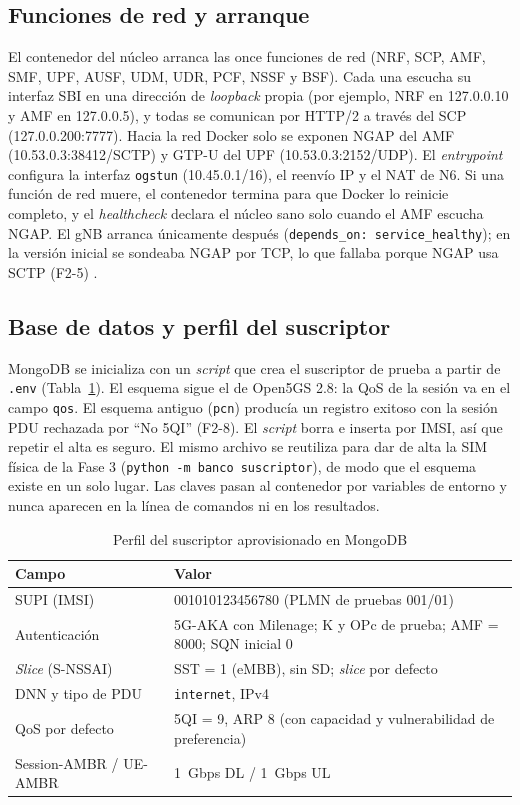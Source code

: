 \documentclass[conference]{IEEEtran}
\begin{document}
\subsection{Funciones de red y arranque}
El contenedor del núcleo arranca las once funciones de red (NRF, SCP, AMF, SMF, UPF, AUSF, UDM, UDR, PCF, NSSF y BSF). Cada una escucha su interfaz SBI en una dirección de \textit{loopback} propia (por ejemplo, NRF en 127.0.0.10 y AMF en 127.0.0.5), y todas se comunican por HTTP/2 a través del SCP (127.0.0.200:7777). Hacia la red Docker solo se exponen NGAP del AMF (10.53.0.3:38412/SCTP) y GTP-U del UPF (10.53.0.3:2152/UDP). El \textit{entrypoint} configura la interfaz \texttt{ogstun} (10.45.0.1/16), el reenvío IP y el NAT de N6. Si una función de red muere, el contenedor termina para que Docker lo reinicie completo, y el \textit{healthcheck} declara el núcleo sano solo cuando el AMF escucha NGAP. El gNB arranca únicamente después (\texttt{depends\_on: service\_healthy}); en la versión inicial se sondeaba NGAP por TCP, lo que fallaba porque NGAP usa SCTP (F2-5) \cite{rfc4960}.

\subsection{Base de datos y perfil del suscriptor}
MongoDB se inicializa con un \textit{script} que crea el suscriptor de prueba a partir de \texttt{.env} (Tabla~\ref{tab:suscriptor}). El esquema sigue el de Open5GS 2.8: la QoS de la sesión va en el campo \texttt{qos}. El esquema antiguo (\texttt{pcn}) producía un registro exitoso con la sesión PDU rechazada por ``No 5QI'' (F2-8). El \textit{script} borra e inserta por IMSI, así que repetir el alta es seguro. El mismo archivo se reutiliza para dar de alta la SIM física de la Fase 3 (\texttt{python -m banco suscriptor}), de modo que el esquema existe en un solo lugar. Las claves pasan al contenedor por variables de entorno y nunca aparecen en la línea de comandos ni en los resultados.

\begin{table}[!t]
\caption{Perfil del suscriptor aprovisionado en MongoDB}
\label{tab:suscriptor}
\centering
\footnotesize
\renewcommand{\arraystretch}{1.12}
\begin{tabular}{p{2.6cm}p{5.0cm}}
\toprule
\textbf{Campo} & \textbf{Valor} \\
\midrule
SUPI (IMSI) & 001010123456780 (PLMN de pruebas 001/01) \\
Autenticación & 5G-AKA con Milenage; K y OPc de prueba; AMF = 8000; SQN inicial 0 \\
\textit{Slice} (S-NSSAI) & SST = 1 (eMBB), sin SD; \textit{slice} por defecto \\
DNN y tipo de PDU & \texttt{internet}, IPv4 \\
QoS por defecto & 5QI = 9, ARP 8 (con capacidad y vulnerabilidad de preferencia) \\
Session-AMBR / UE-AMBR & 1~Gbps DL / 1~Gbps UL \\
\bottomrule
\end{tabular}
\end{table}
\end{document}
